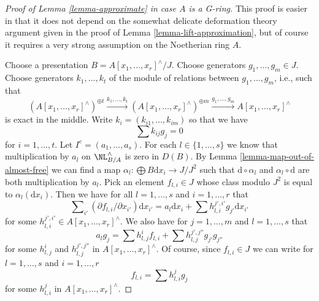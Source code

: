 \begin{proof}[Proof of Lemma \ref{lemma-approximate} in case $A$ is a G-ring]
This proof is easier in that it does not depend on the somewhat
delicate deformation theory argument given in the proof of
Lemma \ref{lemma-lift-approximation}, but of course it requires
a very strong assumption on the Noetherian ring $A$.

\medskip\noindent
Choose a presentation $B = A[x_1, \ldots, x_r]^\wedge/J$.
Choose generators $g_1, \ldots, g_m \in J$.
Choose generators $k_1, \ldots, k_t$ of the module
of relations between $g_1, \ldots, g_m$, i.e., such that
$$
(A[x_1, \ldots, x_r]^\wedge)^{\oplus t} \xrightarrow{k_1, \ldots, k_t}
(A[x_1, \ldots, x_r]^\wedge)^{\oplus m} \xrightarrow{g_1, \ldots, g_m}
A[x_1, \ldots, x_r]^\wedge
$$
is exact in the middle. Write $k_i = (k_{i1}, \ldots, k_{im})$ so that we have
\begin{equation}
\label{equation-relations-straight-up}
\sum k_{ij}g_j = 0
\end{equation}
for $i = 1, \ldots, t$.
Let $I^c = (a_1, \ldots, a_s)$. For each $l \in \{1, \ldots, s\}$
we know that multiplication by $a_l$ on $\NL^\wedge_{B/A}$ is zero
in $D(B)$. By Lemma \ref{lemma-map-out-of-almost-free} we can find a map
$\alpha_l : \bigoplus B\text{d}x_i \to J/J^2$ such that
$\text{d} \circ \alpha_l$ and $\alpha_l \circ \text{d}$ are both
multiplication by $a_l$. Pick an element $f_{l, i} \in J$ whose
class modulo $J^2$ is equal to $\alpha_l(\text{d}x_i)$.
Then we have for all $l = 1, \ldots, s$ and $i = 1, \ldots, r$ that
\begin{equation}
\label{equation-derivatives}
\sum\nolimits_{i'} (\partial f_{l, i}/ \partial x_{i'}) \text{d}x_{i'} =
a_l \text{d}x_i + \sum h_{l, i}^{j', i'} g_{j'} \text{d}x_{i'}
\end{equation}
for some $h_{l, i}^{j', i'} \in A[x_1, \ldots, x_r]^\wedge$.
We also have for $j = 1, \ldots, m$ and $l = 1, \ldots, s$ that
\begin{equation}
\label{equation-ci}
a_l g_j = \sum h_{l, j}^if_{l, i} + \sum h_{l, j}^{j', j''}g_{j'} g_{j''}
\end{equation}
for some $h_{l, j}^i$ and $h_{l, j}^{j', j''}$ in
$A[x_1, \ldots, x_r]^\wedge$. Of course, since $f_{l, i} \in J$
we can write for $l = 1, \ldots, s$ and $i = 1, \ldots, r$
\begin{equation}
\label{equation-in-ideal}
f_{l, i} = \sum h_{l, i}^jg_j
\end{equation}
for some $h_{l, i}^j$ in $A[x_1, \ldots, x_r]^\wedge$.


\end{proof}
